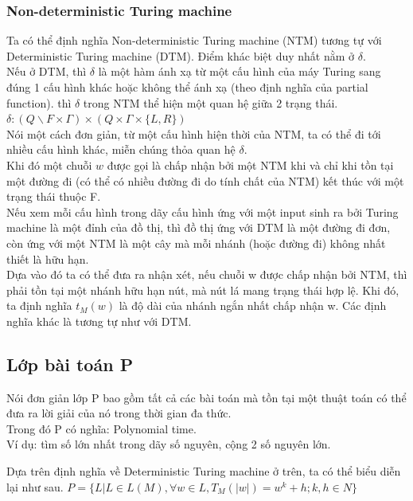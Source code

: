 \documentclass[a4paper 14pt]{extarticle}
\begin{document}
			\subsubsection{Non-deterministic Turing machine}
				Ta có thể định nghĩa Non-deterministic Turing machine (NTM) tương tự với Deterministic Turing machine (DTM). Điểm khác biệt duy nhất nằm ở $\delta$.\\
				Nếu ở DTM, thì $\delta$ là một hàm ánh xạ từ một cấu hình của máy Turing sang đúng 1 cấu hình khác hoặc không thể ánh xạ (theo định nghĩa của partial function). thì $\delta$ trong NTM thể hiện một quan hệ giữa 2 trạng thái.\\
				$\delta: (Q\backslash F \times \Gamma) \times (Q \times \Gamma \times \{L,R\})$\\
				Nói một cách đơn giản, từ một cấu hình hiện thời của NTM, ta có thể đi tới nhiều cấu hình khác, miễn chúng thỏa quan hệ $\delta$.\\
				Khi đó một chuỗi $w$ được gọi là chấp nhận bởi một NTM khi và chỉ khi tồn tại một đường đi (có thể có nhiều đường đi do tính chất của NTM) kết thúc với một trạng thái thuộc F.\\
				Nếu xem mỗi cấu hình trong dãy cấu hình ứng với một input sinh ra bởi Turing machine là một đỉnh của đồ thị, thì đồ thị ứng với DTM là một đường đi đơn, còn ứng với một NTM là một cây mà mỗi nhánh (hoặc đường đi) không nhất thiết là hữu hạn.\\
				Dựa vào đó ta có thể đưa ra nhận xét, nếu chuỗi w được chấp nhận bởi NTM, thì phải tồn tại một nhánh hữu hạn nút, mà nút lá mang trạng thái hợp lệ. Khi đó, ta định nghĩa $t_M(w)$ là độ dài của nhánh ngắn nhất chấp nhận w. Các định nghĩa khác là tương tự như với DTM.\\ 
		\subsection{Lớp bài toán P}
			Nói đơn giản lớp P bao gồm tất cả các bài toán mà tồn tại một thuật toán có thể đưa ra lời giải của nó trong thời gian đa thức.\\
			Trong đó P có nghĩa: Polynomial time.\\
			Ví dụ: tìm số lớn nhất trong dãy số nguyên, cộng 2 số nguyên lớn.
			
			Dựa trên định nghĩa về Deterministic Turing machine ở trên, ta có thể biểu diễn lại như sau.
			$P = \{L| L \in L(M), \forall w \in L, T_M(|w|) = w^k + h; k,h \in N\}$
			
\end{document}
